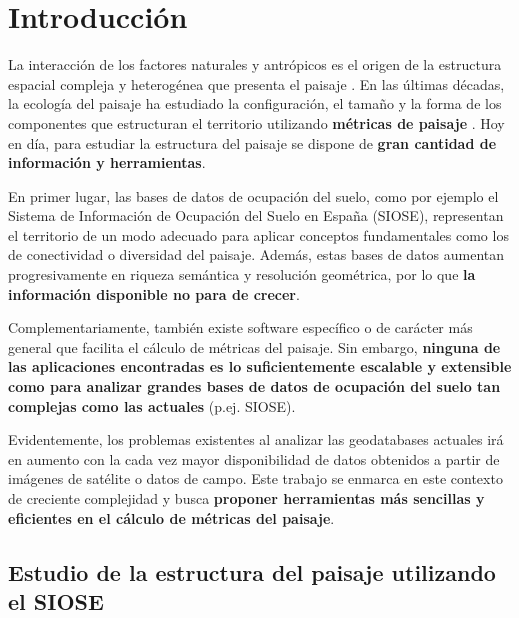 
\chapter{Introducción}\label{chap:intro}

La interacción de los factores naturales y antrópicos es el origen de la estructura espacial compleja y heterogénea que presenta el paisaje \citep{Forman1986,Turner2001}. En las últimas décadas, la ecología del paisaje ha estudiado la configuración, el tamaño y la forma de los componentes que estructuran el territorio utilizando \textbf{métricas de paisaje} \citep{Aguilera2010}. Hoy en día, para estudiar la estructura del paisaje se dispone de \textbf{gran cantidad de información y herramientas}. 

En primer lugar, las bases de datos de ocupación del suelo, como por ejemplo el Sistema de Información de Ocupación del Suelo en España (SIOSE), representan el territorio de un modo adecuado para aplicar conceptos fundamentales como los de conectividad o diversidad del paisaje. Además, estas bases de datos aumentan progresivamente en riqueza semántica y resolución geométrica, por lo que \textbf{la información disponible no para de crecer}.

Complementariamente, también existe software específico o de carácter más general que facilita el cálculo de métricas del paisaje. Sin embargo, \textbf{ninguna de las aplicaciones encontradas es lo suficientemente escalable y extensible como para analizar grandes bases de datos de ocupación del suelo tan complejas como las actuales} (p.ej. SIOSE). 

Evidentemente, los problemas existentes al analizar las geodatabases actuales irá en aumento con la cada vez mayor disponibilidad de datos obtenidos a partir de imágenes de satélite o datos de campo. Este trabajo se enmarca en este contexto de creciente complejidad y busca \textbf{proponer herramientas más sencillas y eficientes en el cálculo de métricas del paisaje}.


\section{Estudio de la estructura del paisaje utilizando el SIOSE}

